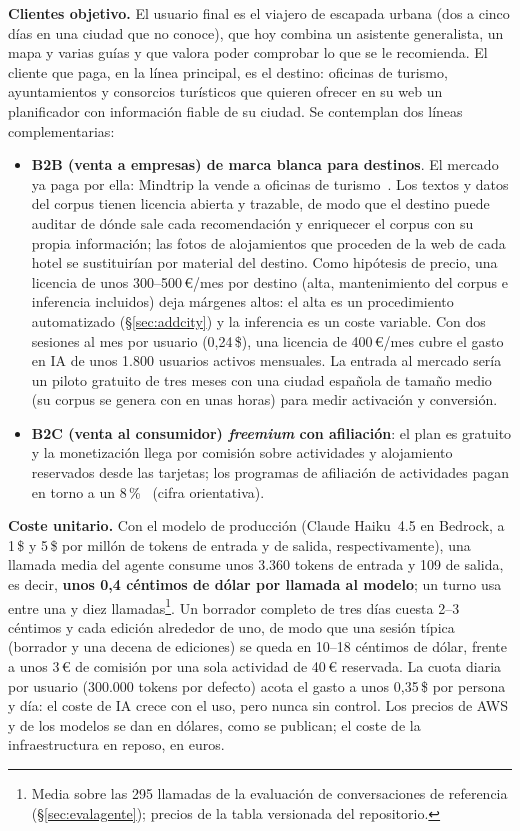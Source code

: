 \textbf{Clientes objetivo.} El usuario final es el viajero de escapada urbana (dos a cinco días en
una ciudad que no conoce), que hoy combina un asistente generalista, un mapa y varias guías y que
valora poder comprobar lo que se le recomienda. El cliente que paga, en la línea principal, es el
destino: oficinas de turismo, ayuntamientos y consorcios turísticos que quieren ofrecer en su web
un planificador con información fiable de su ciudad. Se contemplan dos líneas complementarias:
\begin{itemize}
  \item \textbf{B2B (venta a empresas) de marca blanca para destinos}. El mercado ya paga por ella: Mindtrip la vende a
        oficinas de turismo~\cite{mindtrip2025bvi}. Los textos y datos del corpus
        tienen licencia abierta y trazable, de modo que el destino puede auditar de dónde sale cada
        recomendación y enriquecer el corpus con su propia información; las fotos de alojamientos
        que proceden de la web de cada hotel se sustituirían por material del destino. Como
        hipótesis de precio, una licencia de unos 300--500\,€/mes por destino (alta, mantenimiento
        del corpus e inferencia incluidos) deja márgenes altos: el alta es un procedimiento
        automatizado (§\ref{sec:addcity}) y la inferencia es un coste variable. Con dos sesiones
        al mes por usuario (0,24\,\$), una licencia de 400\,€/mes cubre el gasto en IA de unos
        1.800 usuarios activos mensuales. La entrada al mercado sería un piloto gratuito de tres
        meses con una ciudad española de tamaño medio (su corpus se genera con 
        en unas horas) para medir activación y conversión.
  \item \textbf{B2C (venta al consumidor) \emph{freemium} con afiliación}: el plan es gratuito y la monetización llega
        por comisión sobre actividades y alojamiento reservados desde las tarjetas; los programas
        de afiliación de actividades pagan en torno a un 8\,\%~\cite{track3602026} (cifra
        orientativa).
\end{itemize}

\textbf{Coste unitario.} Con el modelo de producción (Claude Haiku~4.5 en Bedrock, a 1\,\$ y
5\,\$ por millón de tokens de entrada y de salida, respectivamente), una llamada media del agente consume unos 3.360
tokens de entrada y 109 de salida, es decir, \textbf{unos 0,4 céntimos de dólar por llamada al
modelo}; un turno usa entre una y diez llamadas\footnote{Media
sobre las 295 llamadas de la evaluación de conversaciones de referencia (§\ref{sec:evalagente});
precios de la tabla versionada del repositorio.}. Un borrador completo de tres días cuesta 2--3
céntimos y cada edición alrededor de uno, de modo que una sesión típica
(borrador y una decena de ediciones) se queda en 10--18 céntimos de dólar, frente a unos 3\,€ de comisión
por una sola actividad de 40\,€ reservada. La cuota diaria por usuario (300.000 tokens por
defecto) acota el gasto a unos 0,35\,\$ por persona y día: el coste de IA crece con el uso, pero
nunca sin control. Los precios de AWS y de los modelos se dan en dólares, como se publican; el
coste de la infraestructura en reposo, en euros.

